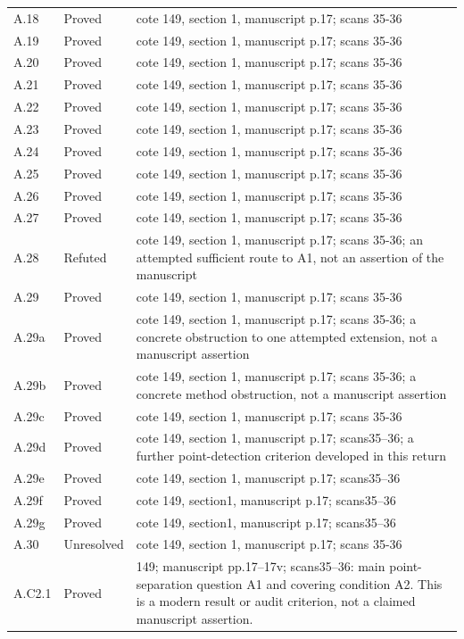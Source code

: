 {\begin{longtable}{p{1.9cm}p{1.7cm}p{10.3cm}}
A.18 & Proved & cote 149, section 1, manuscript p.17; scans 35-36 \\
A.19 & Proved & cote 149, section 1, manuscript p.17; scans 35-36 \\
A.20 & Proved & cote 149, section 1, manuscript p.17; scans 35-36 \\
A.21 & Proved & cote 149, section 1, manuscript p.17; scans 35-36 \\
A.22 & Proved & cote 149, section 1, manuscript p.17; scans 35-36 \\
A.23 & Proved & cote 149, section 1, manuscript p.17; scans 35-36 \\
A.24 & Proved & cote 149, section 1, manuscript p.17; scans 35-36 \\
A.25 & Proved & cote 149, section 1, manuscript p.17; scans 35-36 \\
A.26 & Proved & cote 149, section 1, manuscript p.17; scans 35-36 \\
A.27 & Proved & cote 149, section 1, manuscript p.17; scans 35-36 \\
A.28 & Refuted & cote 149, section 1, manuscript p.17; scans 35-36; an attempted sufficient route to A1, not an assertion of the manuscript \\
A.29 & Proved & cote 149, section 1, manuscript p.17; scans 35-36 \\
A.29a & Proved & cote 149, section 1, manuscript p.17; scans 35-36; a concrete obstruction to one attempted extension, not a manuscript assertion \\
A.29b & Proved & cote 149, section 1, manuscript p.17; scans 35-36; a concrete method obstruction, not a manuscript assertion \\
A.29c & Proved & cote 149, section 1, manuscript p.17; scans 35-36 \\
A.29d & Proved & cote 149, section 1, manuscript p.17; scans35–36; a further point-detection criterion developed in this return \\
A.29e & Proved & cote 149, section 1, manuscript p.17; scans35–36 \\
A.29f & Proved & cote 149, section1, manuscript p.17; scans35–36 \\
A.29g & Proved & cote 149, section1, manuscript p.17; scans35–36 \\
A.30 & Unresolved & cote 149, section 1, manuscript p.17; scans 35-36 \\
A.C2.1 & Proved & 149; manuscript pp.17–17v; scans35–36: main point-separation question A1 and covering condition A2. This is a modern result or audit criterion, not a claimed manuscript assertion. \\

\end{longtable}}
